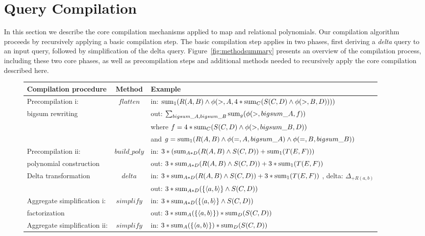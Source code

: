 \section{Query Compilation}
In this section we describe the core compilation mechanisms applied to map and
relational polynomials. Our compilation algorithm proceeds by recursively
applying a basic compilation step. The basic compilation step applies in two
phases, first deriving a \textit{delta} query to an input query, followed by
simplification of the delta query. Figure~\ref{fig:methodsummary} presents an
overview of the compilation process, including these two core phases, as well as
precompilation steps and additional methods needed to recursively apply the core
compilation described here.

\begin{figure*}
\begin{center}
\begin{tabular}{|l|c|l|}
\hline
Compilation procedure & Method & Example \\
\hline Precompilation i:            & $flatten$
& in: $\mathrm{sum}_{1}(R(A,B) \wedge \phi(>,A,4*
           \mathrm{sum}_{C}(S(C,D) \wedge \phi(>,B,D))))$
\\
bigsum rewriting & & out: $\sum_{bigsum\_A, bigsum\_B}{\mathrm{sum}_{g} (\phi(>,bigsum\_A, f))}$
\\
& & where $f = 4* \mathrm{sum}_{C}(S(C,D) \wedge \phi(>,bigsum\_B,D))$
\\
& & and $g = \mathrm{sum}_{1}(R(A,B) \wedge \phi(=,A,bigsum\_A)
           \wedge \phi(=,B,bigsum\_B))$
\\
\hline Precompilation ii:  & $build\_poly$
& in: $3 * (\mathrm{sum}_{A*D}(R(A,B) \wedge S(C,D)) + \mathrm{sum}_{1}(T(E,F)))$
\\
polynomial construction &
& out: $3*\mathrm{sum}_{A*D}(R(A,B) \wedge S(C,D)) + 3*\mathrm{sum}_{1}(T(E,F))$
\\
\hline Delta transformation        & $delta$
& in:
    $ 3*\mathrm{sum}_{A*D}(R(A,B) \wedge S(C,D)) +
     3*\mathrm{sum}_{1}(T(E,F))$
, delta: $\Delta_{+R(a,b)}$
\\
& & out:
    $3*\mathrm{sum}_{A*D}(\{{\langle a,b\rangle}\} \wedge S(C,D))$
\\
\hline Aggregate simplification i:  & $simplify$
& in: $3*\mathrm{sum}_{A*D}(\{{\langle a,b\rangle}\} \wedge S(C,D))$
\\
factorization & & out:
    $3*\mathrm{sum}_{A}(\{{\langle a,b\rangle}\})*\mathrm{sum}_{D}(S(C,D))$
\\
\hline Aggregate simplification ii: & $simplify$
& in: $3*\mathrm{sum}_{A}(\{{\langle a,b\rangle}\})*\mathrm{sum}_{D}(S(C,D))$

\end{tabular}
\end{center}
\end{figure*}
